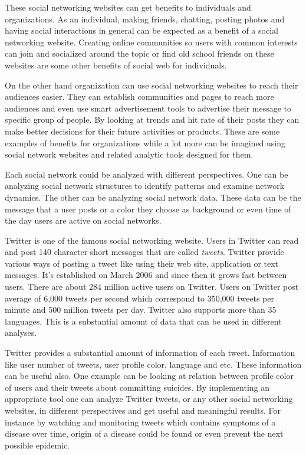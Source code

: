\documentclass[a4paper,11pt]{report}
\begin{document}
These social networking websites can get benefits to individuals and organizations. As an individual, making friends, chatting, posting photos and having social interactions in general can be expected as a benefit of a social networking website. Creating online communities so users with common interests can join and socialized around the topic or find old school friends on these websites are some other benefits of social web for individuals.

On the other hand organization can use social networking websites to reach their audiences easier. They can establish communities and pages to reach more audiences and even use smart advertisement tools to advertise their message to specific group of people. By looking at trends and hit rate of their posts they can make better decisions for their future activities or products. These are some examples of benefits for organizations while a lot more can be imagined using social network websites and related analytic tools designed for them.

Each social network could be analyzed with different perspectives. One can be analyzing social network structures to identify patterns and examine network dynamics. The other can be analyzing social network data. These data can be the message that a user posts or a color they choose as background or even time of the day users are active on social networks.

Twitter is one of the famous social networking website. Users in Twitter can read and post 140 character short messages that are called \emph{tweets}. Twitter provide various ways of posting a tweet like using their web site, application or text messages. It's established on March 2006 and since then it grows fast between users\cite{twitterstat}. There are about 284 million active users on Twitter. Users on Twitter post average of 6,000 tweets per second which correspond to 350,000 tweets per minute and 500 million tweets per day\cite{twittercompany}. Twitter also supports more than 35 languages. This is a substantial amount of data that can be used in different analyses.

Twitter provides a substantial amount of information of each tweet. Information like user number of tweets, user profile color, language and etc. These information can be useful also. One example can be looking at relation between profile color of users and their tweets about committing suicides. By implementing an appropriate tool one can analyze Twitter tweets, or any other social networking websites, in different perspectives and get useful and meaningful results. For instance by watching and monitoring tweets which contains symptoms of a disease over time, origin of a disease could be found or even prevent the next possible epidemic.
\end{document}
